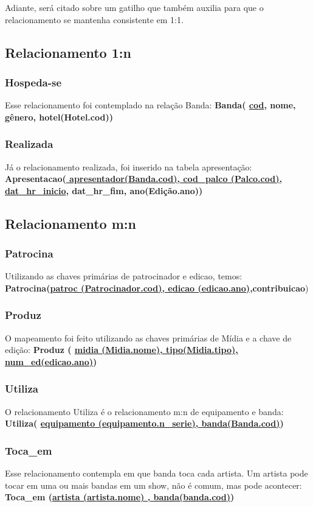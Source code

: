 \documentclass[12pt]{article}
\begin{document}
Adiante, será citado sobre um gatilho que também auxilia para que o relacionamento se mantenha consistente em 1:1.


\subsection{Relacionamento 1:n}	
	\subsubsection{Hospeda-se}
		Esse relacionamento foi contemplado na relação Banda: \textbf{Banda( \underline{cod}, nome, gênero, hotel(Hotel.cod))}

	\subsubsection{Realizada}
		Já o relacionamento realizada, foi inserido na tabela apresentação: \\ \textbf{Apresentacao(\underline{  apresentador(Banda.cod), cod\_palco (Palco.cod), dat\_hr\_inicio}, dat\_hr\_fim, ano(Edição.ano))}
\subsection{Relacionamento m:n}

\subsubsection{Patrocina}
Utilizando as chaves primárias de patrocinador e edicao, temos: \\
\textbf{Patrocina(\underline{patroc (Patrocinador.cod), edicao (edicao.ano)},contribuicao})

\subsubsection{Produz}
O mapeamento foi feito utilizando as chaves primárias de Mídia 
e a chave de edição:
\textbf{Produz ( \underline{midia (Midia.nome), tipo(Midia.tipo), num\_ed(edicao.ano)})
}
\subsubsection{Utiliza}
O relacionamento Utiliza é o relacionamento m:n de equipamento e banda: 
\textbf{Utiliza( \underline{equipamento (equipamento.n\_serie), banda(Banda.cod)})}

\subsubsection{Toca\_em}
Esse relacionamento contempla em que banda toca cada artista. Um artista pode tocar em uma ou mais bandas em um show, não é comum, mas pode acontecer:
\textbf{Toca\_em (\underline{artista (artista.nome) , banda(banda.cod)})}
\end{document}

